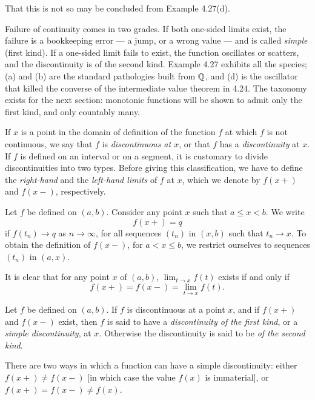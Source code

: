 That this is not so may be concluded from Example 4.27(d).


\begin{signpost}
Failure of continuity comes in two grades. If both one-sided limits exist,
the failure is a bookkeeping error --- a jump, or a wrong value --- and is
called \emph{simple} (first kind). If a one-sided limit fails to exist, the
function oscillates or scatters, and the discontinuity is of the second kind.
Example 4.27 exhibits all the species; (a) and (b) are the standard
pathologies built from $\mathbb{Q}$, and (d) is the oscillator that killed the
converse of the intermediate value theorem in 4.24. The taxonomy exists for
the next section: monotonic functions will be shown to admit only the first
kind, and only countably many.
\end{signpost}

\noindent
If $x$ is a point in the domain of definition of the function $f$ at which
$f$ is not continuous, we say that $f$ is \emph{discontinuous at $x$}, or
that $f$ has a \emph{discontinuity} at $x$. If $f$ is defined on an interval
or on a segment, it is customary to divide discontinuities into two types.
Before giving this classification, we have to define the \emph{right-hand}
and the \emph{left-hand limits} of $f$ at $x$, which we denote by $f(x+)$ and
$f(x-)$, respectively.

Let $f$ be defined on $(a,b)$. Consider any point $x$ such that
$a \le x < b$. We write
\[ f(x+) = q \]
if $f(t_n) \to q$ as $n \to \infty$, for all sequences $(t_n)$ in $(x,b)$
such that $t_n \to x$. To obtain the definition of $f(x-)$, for
$a < x \le b$, we restrict ourselves to sequences $(t_n)$ in $(a,x)$.

It is clear that for any point $x$ of $(a,b)$, $\lim_{t\to x} f(t)$ exists if
and only if
\[ f(x+) = f(x-) = \lim_{t\to x} f(t). \]

Let $f$ be defined on $(a,b)$. If $f$ is discontinuous at a point $x$, and if
$f(x+)$ and $f(x-)$ exist, then $f$ is said to have a \emph{discontinuity of
the first kind}, or a \emph{simple discontinuity}, at $x$. Otherwise the
discontinuity is said to be \emph{of the second kind}.

There are two ways in which a function can have a simple discontinuity:
either $f(x+) \ne f(x-)$ [in which case the value $f(x)$ is immaterial], or
$f(x+) = f(x-) \ne f(x)$.

